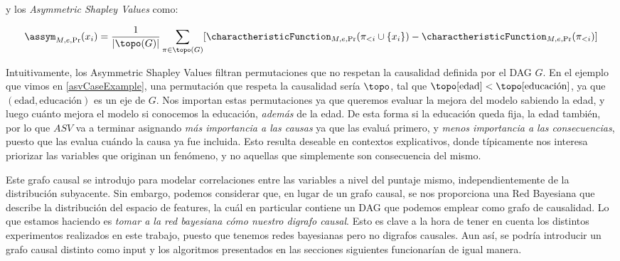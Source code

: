y los \textit{Asymmetric Shapley Values} como:

\[
\assym_{M,e,\Pr}(x_i) = \frac{1}{|\topo(G)|} \sum_{\pi \in \topo(G)} [\charactheristicFunction_{M,e,\Pr}(\pi_{<i} \cup \{x_i\}) - \charactheristicFunction_{M,e,\Pr}(\pi_{<i})] 
\]

Intuitivamente, los Asymmetric Shapley Values filtran permutaciones que no respetan la causalidad definida por el DAG $G$. En el ejemplo que vimos en \ref{asvCaseExample}, una permutación que respeta la causalidad sería $\topo$, tal que $\topo[\text{edad}] < \topo[\text{educación}]$, ya que $(\text{edad}, \text{educación})$ es un eje de $G$. Nos importan estas permutaciones ya que queremos evaluar la mejora del modelo sabiendo la edad, y luego cuánto mejora el modelo si conocemos la educación, \emph{además} de la edad. De esta forma si la educación queda fija, la edad también, por lo que $ASV$ va a terminar asignando \emph{más importancia a las causas} ya que las evaluá primero, y \emph{menos importancia a las consecuencias}, puesto que las evalua cuándo la causa ya fue incluida. Esto resulta deseable en contextos explicativos, donde típicamente nos interesa priorizar las variables que originan un fenómeno, y no aquellas que simplemente son consecuencia del mismo.


Este grafo causal se introdujo para modelar correlaciones entre las variables a nivel del puntaje mismo, independientemente de la distribución subyacente. Sin embargo, podemos considerar que, en lugar de un grafo causal, se nos proporciona una Red Bayesiana que describe la distribución del espacio de features, la cuál en particular contiene un DAG que podemos emplear como grafo de causalidad. Lo que estamos haciendo es \emph{tomar a la red bayesiana cómo nuestro digrafo causal}.
Esto es clave a la hora de tener en cuenta los distintos experimentos realizados en este trabajo, puesto que tenemos redes bayesianas pero no digrafos causales. Aun así, se podría introducir un grafo causal distinto como input y los algoritmos presentados en las secciones siguientes funcionarían de igual manera. 



